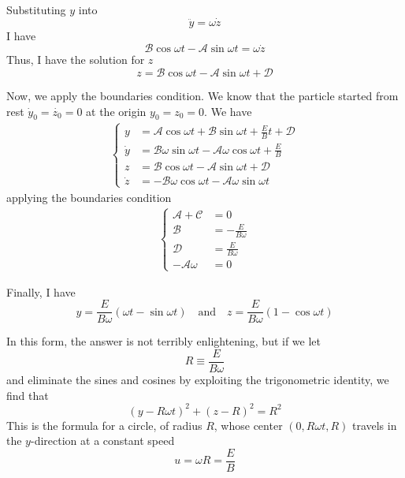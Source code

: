 \documentclass[../../../main.tex]{subfiles}
\begin{document}
Substituting $y$ into
\begin{equation*}
    \ddot{y}=\omega \dot{z}
\end{equation*}
I have 
\begin{equation*}
    \mathcal{B}\cos \omega t- \mathcal{A}\sin \omega t=\omega \dot{z}
\end{equation*}
Thus, I have the solution for $z$
\begin{equation*}
    z=\mathcal{B}\cos \omega t-\mathcal{A}\sin \omega t+\mathcal{D}
\end{equation*}

Now, we apply the boundaries condition. We know that the particle started from rest $\dot{y}_0=\dot{z_0}=0$ at the origin $ y_0=z_0=0$. We have
\begin{align*}
    \begin{cases}
            y&=\mathcal{A}\cos \omega t+\mathcal{B}\sin\omega t+\frac{E}{B}t+\mathcal{D}\\
    \dot{y}&=\mathcal{B}\omega\sin\omega t-\mathcal{A}\omega\cos \omega t+\frac{E}{B}\\
    z&=\mathcal{B}\cos \omega t-\mathcal{A}\sin \omega t+\mathcal{D}\\
    \dot{z}&=-\mathcal{B}\omega\cos \omega t-\mathcal{A}\omega\sin \omega t
    \end{cases}
\end{align*}
applying the boundaries condition
\begin{align*}
    \begin{cases}
         \mathcal{A}+\mathcal{C}&=0\\
    \mathcal{B}&=-\frac{E}{B\omega}\\
    \mathcal{D}&=\frac{E}{B\omega}\\
    -\mathcal{A}\omega&=0
    \end{cases}
\end{align*}

Finally, I have 
\begin{equation*}
    y=\frac{E}{B\omega}(\omega t-\sin \omega t)\quad \text{and}\quad z=\frac{E}{B\omega}(1-\cos\omega t)
\end{equation*}

In this form, the answer is not terribly enlightening, but if we let
\begin{equation*}
    R\equiv\frac{E}{B\omega}
\end{equation*}
and eliminate the sines and cosines by exploiting the trigonometric identity, we ﬁnd that
\begin{equation*}
    (y - R\omega t)^2 + (z - R)^2 = R^2
\end{equation*}
This is the formula for a circle, of radius $R$, whose center $(0, R\omega t, R)$ travels in the $y$-direction at a constant speed
\begin{equation*}
    u=\omega R=\frac{E}{B}
\end{equation*}
\end{document}
